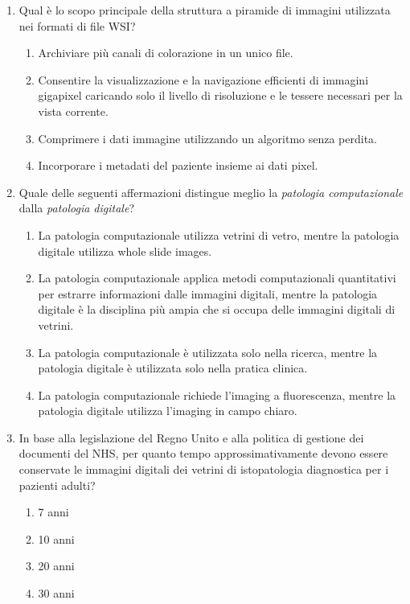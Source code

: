 \begin{enumerate}
  \item \label{ch1:q8} Qual è lo scopo principale della struttura a piramide di immagini utilizzata nei formati di file WSI?
  \begin{enumerate}[label=\Alph*.]
    \item Archiviare più canali di colorazione in un unico file.
    \item Consentire la visualizzazione e la navigazione efficienti di immagini gigapixel caricando solo il livello di risoluzione e le tessere necessari per la vista corrente.
    \item Comprimere i dati immagine utilizzando un algoritmo senza perdita.
    \item Incorporare i metadati del paziente insieme ai dati pixel.
  \end{enumerate}

  \item \label{ch1:q9} Quale delle seguenti affermazioni distingue meglio la \emph{patologia computazionale} dalla \emph{patologia digitale}?
  \begin{enumerate}[label=\Alph*.]
    \item La patologia computazionale utilizza vetrini di vetro, mentre la patologia digitale utilizza whole slide images.
    \item La patologia computazionale applica metodi computazionali quantitativi per estrarre informazioni dalle immagini digitali, mentre la patologia digitale è la disciplina più ampia che si occupa delle immagini digitali di vetrini.
    \item La patologia computazionale è utilizzata solo nella ricerca, mentre la patologia digitale è utilizzata solo nella pratica clinica.
    \item La patologia computazionale richiede l'imaging a fluorescenza, mentre la patologia digitale utilizza l'imaging in campo chiaro.
  \end{enumerate}

  \item \label{ch1:q10} In base alla legislazione del Regno Unito e alla politica di gestione dei documenti del NHS, per quanto tempo approssimativamente devono essere conservate le immagini digitali dei vetrini di istopatologia diagnostica per i pazienti adulti?
  \begin{enumerate}[label=\Alph*.]
    \item 7 anni
    \item 10 anni
    \item 20 anni
    \item 30 anni
  \end{enumerate}

\end{enumerate}

